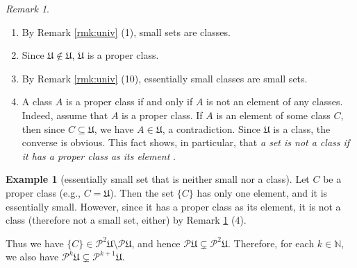 \documentclass{surv-l}
\numberwithin{equation}{chapter}
\numberwithin{figure}{chapter}
\theoremstyle{plain}
\theoremstyle{definition}
\newtheorem{exm}[thm]{Example}
\theoremstyle{remark}
\newtheorem{rmk}[thm]{Remark}
\begin{document}
\begin{rmk}\leavevmode
\label{rmk:small-proper-class}
\begin{enumerate}
\item
By Remark \ref{rmk:univ} (1), small sets are classes.
\item
Since $\mathfrak{U} \not\in \mathfrak{U}$, $\mathfrak{U}$ is a proper class.
\item
By Remark \ref{rmk:univ} (10), essentially small classes are small sets.
\item
A class $A$ is a proper class if and only if
$A$ is not an element of any classes.
Indeed, assume that $A$ is a proper class. If $A$ is an element of some class $C$,
then since $C \subseteq \mathfrak{U}$, we have $A \in \mathfrak{U}$, a contradiction.
Since $\mathfrak{U}$ is a class, the converse is obvious.
This fact shows, in particular, that {\em a set is not a class if it has a proper class as its element
}.
\end{enumerate}
\end{rmk}

\begin{exm}[essentially small set that is neither small nor a class]
Let $C$ be a proper class (e.g., $C = \mathfrak{U}$).
Then the set $\{C\}$ has only one element, and it is essentially small.
However, since it has a proper class as its element,
it is not a class (therefore not a small set, either) by Remark \ref{rmk:small-proper-class} (4).

Thus we have $\{C\} \in \mathcal{P}^2\mathfrak{U} \setminus \mathcal{P}\mathfrak{U}$, and hence
$\mathcal{P}\mathfrak{U} \subsetneq \mathcal{P}^2\mathfrak{U}$.
Therefore, for each $k \in \mathbb{N}$, we also have $\mathcal{P}^k\mathfrak{U} \subsetneq \mathcal{P}^{k+1}\mathfrak{U}$.
\end{exm}
\end{document}
